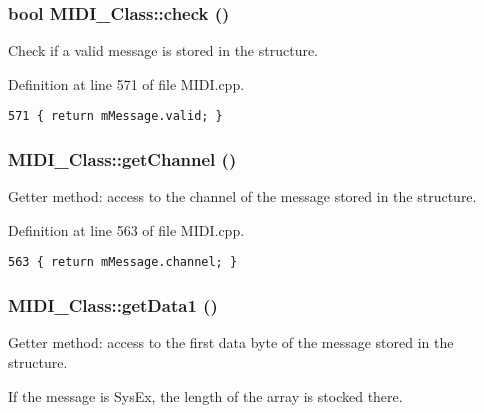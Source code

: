\hypertarget{class_m_i_d_i___class_d5f7a96c5bb338946a0be1d243877155}{
\subsubsection[{check}]{\setlength{\rightskip}{0pt plus 5cm}bool MIDI\_\-Class::check ()}}
\label{class_m_i_d_i___class_d5f7a96c5bb338946a0be1d243877155}


Check if a valid message is stored in the structure. 

Definition at line 571 of file MIDI.cpp.

\begin{Code}\begin{verbatim}571 { return mMessage.valid; }
\end{verbatim}
\end{Code}


\hypertarget{class_m_i_d_i___class_6b7ac8309663b69decfd1bd2925fcbef}{
\subsubsection[{getChannel}]{ MIDI\_\-Class::getChannel ()}}
\label{class_m_i_d_i___class_6b7ac8309663b69decfd1bd2925fcbef}


Getter method: access to the channel of the message stored in the structure. 

Definition at line 563 of file MIDI.cpp.

\begin{Code}\begin{verbatim}563 { return mMessage.channel; }
\end{verbatim}
\end{Code}


\hypertarget{class_m_i_d_i___class_a64038c767252e358decc469ba99d4e3}{
\subsubsection[{getData1}]{ MIDI\_\-Class::getData1 ()}}
\label{class_m_i_d_i___class_a64038c767252e358decc469ba99d4e3}


Getter method: access to the first data byte of the message stored in the structure. \par
 If the message is SysEx, the length of the array is stocked there. 


